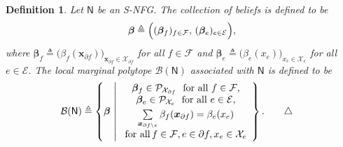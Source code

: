 \documentclass[journal]{IEEEtran}
\newtheorem{definition}[theorem]{Definition}
\newcommand{\vect}[1]{ \bm{#1} }
\newcommand{\set}[1]{\mathcal{#1}}
\newcommand{\beli}{\beta}
\newcommand{\vbeli}{ \vect{\beli} }
\newcommand{\setEfull}{ \mathcal{E} }
\newcommand{\setF}{ \mathcal{F} }
\newcommand{\setpf}{ \partial f }
\newcommand{\xe}{ x_{e} }
\newcommand{\vxf}{ \vect{x}_{\setpf} }
\newcommand{\setxe}{ \mathcal{X}_{e} }
\newcommand{\setxf}{ \mathcal{X}_{\setpf} }
\newcommand{\vx}{ \vect{x} }
\newcommand{\graphN}{ \mathsf{N} }
\newcommand{\setE}{ \mathcal{E} }
\newcommand{\defeq}{ \triangleq }
\newcommand{\LMP}{ \set{B} }
\newcommand{\xf}{ \bm{x}_{\setpf} }
\newcommand{\pmf}[1]{ \set{P}_{#1} }
\begin{document}
\begin{definition}\!\!\cite[Section V]{Yedidia2005}\label{sec:SNFG:def:3}
  Let $\graphN$ be an S-NFG. The collection of beliefs is defined to be
  \begin{align*}
    \vbeli \defeq \Bigl( ( \vbeli_f )_{f \in \setF}, \,
                                                      ( \vbeli_e )_{e \in \setE} \Bigr),
  \end{align*}
  where $ \vbeli_f \defeq \bigl( \beli_f(\vxf) \bigr)_{\! \vxf \in \setxf } $
  for all $ f \in \setF $
  and $ \vbeli_e \defeq \bigl( \beli_e(\xe) \bigr)_{\! \xe \in \setxe } $
  for all $ e \in \setEfull $.
  The local marginal polytope $\LMP(\graphN)$
  associated with $\graphN$ is defined to be
  \begin{align*}
    \LMP(\graphN)
     & \defeq \left\{
    \vbeli
    \ \middle| \
    \begin{array}{c}
      \vbeli_f \in \pmf{\setxf} \ \ \text{for all} \ f \in \setF, \\
      \vbeli_e \in \pmf{\setxe} \ \ \text{for all} \ e \in \setE, \\[0.10cm]
      \sum\limits_{\vx_{\setpf \setminus e}}
      \beli_f(\xf)
      = \beli_e(\xe)                                              \\
      \text{for all} \,
      f \in \setF, e \in \setpf, \xe \in \setxe
    \end{array}
    \right\}. \tag*{\ensuremath{\triangle}}
  \end{align*}
\end{definition}
\end{document}
